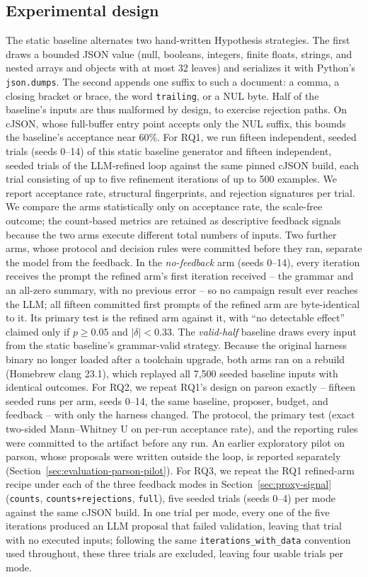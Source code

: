 \subsection{Experimental design}
The static baseline alternates two hand-written Hypothesis strategies. The
first draws a bounded JSON value (null, booleans, integers, finite floats,
strings, and nested arrays and objects with at most 32 leaves) and serializes
it with Python's \texttt{json.dumps}. The second appends one suffix to such a
document: a comma, a closing bracket or brace, the word
\texttt{\textvisiblespace trailing}, or a NUL byte. Half of the baseline's inputs are thus malformed
by design, to exercise rejection paths. On cJSON, whose full-buffer entry point
accepts only the NUL suffix, this bounds the baseline's acceptance near 60\%.
For RQ1, we run fifteen independent, seeded trials (seeds 0--14) of this static
baseline generator and fifteen independent, seeded trials of the LLM-refined
loop against the same pinned cJSON build, each trial consisting of up to
five refinement iterations of up to 500 examples. We report acceptance
rate, structural fingerprints, and rejection signatures per trial. We compare
the arms statistically only on acceptance rate, the scale-free outcome; the
count-based metrics are retained as descriptive feedback signals because the
two arms execute different total numbers of inputs. Two further arms, whose
protocol and decision rules were committed before they ran, separate the
model from the feedback. In the \emph{no-feedback} arm (seeds 0--14), every
iteration receives the prompt the refined arm's first iteration received --
the grammar and an all-zero summary, with no previous error -- so no campaign
result ever reaches the LLM; all fifteen committed first prompts of the
refined arm are byte-identical to it. Its primary test is the refined arm
against it, with ``no detectable effect'' claimed only if $p \geq 0.05$ and
$|\delta| < 0.33$. The \emph{valid-half} baseline draws every input from the
static baseline's grammar-valid strategy. Because the original harness
binary no longer loaded after a toolchain upgrade, both arms ran on a
rebuild (Homebrew clang 23.1), which replayed all 7{,}500 seeded baseline
inputs with identical outcomes. For RQ2, we repeat RQ1's
design on parson exactly -- fifteen seeded runs per arm, seeds 0--14, the
same baseline, proposer, budget, and feedback -- with only the harness
changed. The protocol, the primary test (exact two-sided Mann--Whitney U on
per-run acceptance rate), and the reporting rules were committed to the
artifact before any run. An earlier exploratory pilot on parson, whose
proposals were written outside the loop, is reported separately
(Section~\ref{sec:evaluation-parson-pilot}). For RQ3, we
repeat the RQ1 refined-arm recipe under each of the three feedback modes in
Section~\ref{sec:proxy-signal} (\texttt{counts}, \texttt{counts+rejections},
\texttt{full}), five seeded trials (seeds 0--4) per mode against the same
cJSON build. In one trial per mode, every one of the five iterations
produced an LLM proposal that failed validation, leaving that trial
with no executed inputs; following the same
\texttt{iterations\_with\_data} convention used throughout, these three
trials are excluded, leaving four usable trials per mode.
